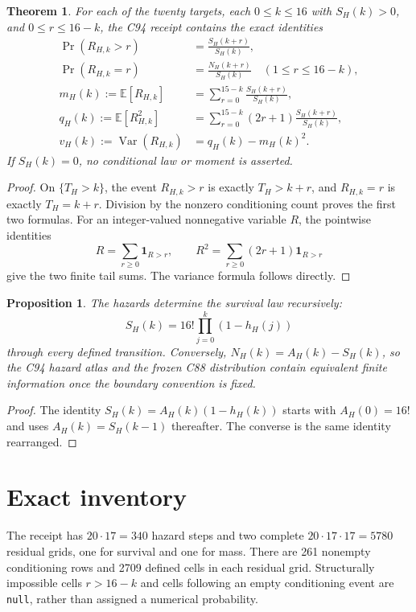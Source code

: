 \documentclass[10pt]{article}
\newtheorem{theorem}{Theorem}
\newtheorem{proposition}{Proposition}
\begin{document}
\begin{theorem}\label{thm:residual}
For each of the twenty targets, each $0\leq k\leq16$ with $S_H(k)>0$, and
$0\leq r\leq16-k$, the C94 receipt contains the exact identities
\begin{align*}
 \Pr(R_{H,k}>r)&=\frac{S_H(k+r)}{S_H(k)},\\
 \Pr(R_{H,k}=r)&=\frac{N_H(k+r)}{S_H(k)}\quad(1\leq r\leq16-k),\\
 m_H(k):=\mathbb E[R_{H,k}]&=\sum_{r=0}^{15-k}\frac{S_H(k+r)}{S_H(k)},\\
 q_H(k):=\mathbb E[R_{H,k}^2]&=
 \sum_{r=0}^{15-k}(2r+1)\frac{S_H(k+r)}{S_H(k)},\\
 v_H(k):=\operatorname{Var}(R_{H,k})&=q_H(k)-m_H(k)^2.
\end{align*}
If $S_H(k)=0$, no conditional law or moment is asserted.
\end{theorem}

\begin{proof}
On $\{T_H>k\}$, the event $R_{H,k}>r$ is exactly $T_H>k+r$, and
$R_{H,k}=r$ is exactly $T_H=k+r$.  Division by the nonzero conditioning
count proves the first two formulas.  For an integer-valued nonnegative
variable $R$, the pointwise identities
\[
 R=\sum_{r\geq0}\mathbf 1_{R>r},\qquad
 R^2=\sum_{r\geq0}(2r+1)\mathbf 1_{R>r}
\]
give the two finite tail sums.  The variance formula follows directly.
\end{proof}

\begin{proposition}
The hazards determine the survival law recursively:
\[
 S_H(k)=16!\prod_{j=0}^{k}(1-h_H(j))
\]
through every defined transition.  Conversely, $N_H(k)=A_H(k)-S_H(k)$,
so the C94 hazard atlas and the frozen C88 distribution contain equivalent
finite information once the boundary convention is fixed.
\end{proposition}
\begin{proof}
The identity $S_H(k)=A_H(k)(1-h_H(k))$ starts with $A_H(0)=16!$ and uses
$A_H(k)=S_H(k-1)$ thereafter.  The converse is the same identity rearranged.
\end{proof}

\section{Exact inventory}
The receipt has $20\cdot17=340$ hazard steps and two complete
$20\cdot17\cdot17=5780$ residual grids, one for survival and one for mass.
There are 261 nonempty conditioning rows and 2709 defined cells in each
residual grid.  Structurally impossible cells $r>16-k$ and cells following an
empty conditioning event are \texttt{null}, rather than assigned a numerical
probability.
\end{document}
